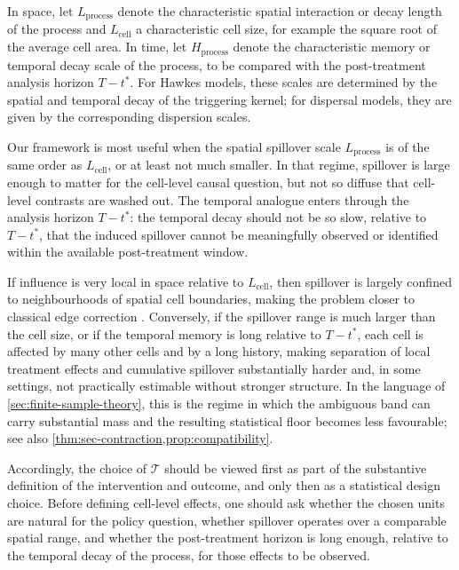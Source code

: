 \documentclass{statsoc}
\newcommand{\1}{\mathbbm{1}}
\begin{document}
In space, let \(L_{\text{process}}\) denote the characteristic spatial interaction or decay length of the process and \(L_{\text{cell}}\) a characteristic cell size, for example the square root of the average cell area. In time, let \(H_{\text{process}}\) denote the characteristic memory or temporal decay scale of the process, to be compared with the post-treatment analysis horizon \(T-t^\ast\). For Hawkes models, these scales are determined by the spatial and temporal decay of the triggering kernel; for dispersal models, they are given by the corresponding dispersion scales.

Our framework is most useful when the spatial spillover scale \(L_{\text{process}}\) is of the same order as \(L_{\text{cell}}\), or at least not much smaller. In that regime, spillover is large enough to matter for the cell-level causal question, but not so diffuse that cell-level contrasts are washed out. The temporal analogue enters through the analysis horizon \(T-t^\ast\): the temporal decay should not be so slow, relative to \(T-t^\ast\), that the induced spillover cannot be meaningfully observed or identified within the available post-treatment window.

If influence is very local in space relative to \(L_{\text{cell}}\), then spillover is largely confined to neighbourhoods of spatial cell boundaries, making the problem closer to classical edge correction \citep{cronie2011some}.%
Conversely, if the spillover range is much larger than the cell size, or if the temporal memory is long relative to \(T-t^\ast\), each cell is affected by many other cells and by a long history, making separation of local treatment effects and cumulative spillover substantially harder and, in some settings, not practically estimable without stronger structure. In the language of \cref{sec:finite-sample-theory}, this is the regime in which the ambiguous band can carry substantial mass and the resulting statistical floor becomes less favourable; see also \cref{thm:sec-contraction,prop:compatibility}.

Accordingly, the choice of \(\mathcal T\) should be viewed first as part of the substantive definition of the intervention and outcome, and only then as a statistical design choice. Before defining cell-level effects, one should ask whether the chosen units are natural for the policy question, whether spillover operates over a comparable spatial range, and whether the post-treatment horizon is long enough, relative to the temporal decay of the process, for those effects to be observed.
\end{document}
